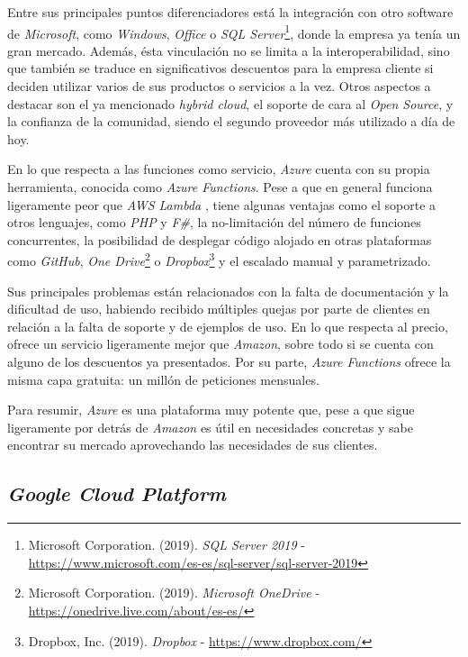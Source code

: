 \documentclass[11pt,spanish,listoffigures]{tfgetsinf}
\begin{document}
Entre sus principales puntos diferenciadores está la integración con otro software de \textit{Microsoft}, como \textit{Windows}, \textit{Office} o \textit{SQL Server}\footnote{Microsoft Corporation. (2019). \textit{SQL Server 2019} - \url{https://www.microsoft.com/es-es/sql-server/sql-server-2019}}, donde la empresa ya tenía un gran mercado. Además, ésta vinculación no se limita a la interoperabilidad, sino que también se traduce en significativos descuentos para la empresa cliente si deciden utilizar varios de sus productos o servicios a la vez. Otros aspectos a destacar son el ya mencionado \textit{\gls{hybrid cloud}}, el soporte de cara al \textit{Open Source}, y la confianza de la comunidad, siendo el segundo proveedor más utilizado a día de hoy.

En lo que respecta a las funciones como servicio, \textit{Azure} cuenta con su propia herramienta, conocida como \textit{Azure Functions}. Pese a que en general funciona ligeramente peor que \textit{AWS Lambda} \cite{azure-vs-lambda}, tiene algunas ventajas como el soporte a otros lenguajes, como \textit{PHP} y \textit{F\#}, la no-limitación del número de funciones concurrentes, la posibilidad de desplegar código alojado en otras plataformas como \textit{GitHub}, \textit{One Drive}\footnote{Microsoft Corporation. (2019). \textit{Microsoft OneDrive} - \url{https://onedrive.live.com/about/es-es/}} o \textit{Dropbox}\footnote{Dropbox, Inc. (2019). \textit{Dropbox} - \url{https://www.dropbox.com/}} y el \gls{escalado} manual y parametrizado.

Sus principales problemas están relacionados con la falta de documentación y la dificultad de uso, habiendo recibido múltiples quejas por parte de clientes en relación a la falta de soporte y de ejemplos de uso. En lo que respecta al precio, ofrece un servicio ligeramente mejor que \textit{Amazon}, sobre todo si se cuenta con alguno de los descuentos ya presentados. Por su parte, \textit{Azure Functions} ofrece la misma capa gratuita: un millón de peticiones mensuales.

Para resumir, \textit{Azure} es una plataforma muy potente que, pese a que sigue ligeramente por detrás de \textit{Amazon} es útil en necesidades concretas y sabe encontrar su mercado aprovechando las necesidades de sus clientes.

\subsection{\textit{Google Cloud Platform}}
\label{sec:google-cloud-platform}
\end{document}
